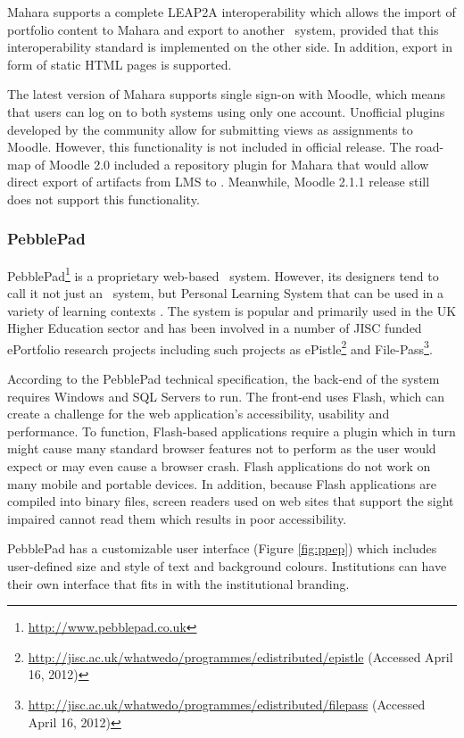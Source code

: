 Mahara supports a complete LEAP2A interoperability
\citep{MaharaGovernanceGroup2011} which allows the import of portfolio content
to Mahara and export to another \ep~system, provided that this interoperability
standard is implemented on the other side. In addition, export in form of static
HTML pages is supported.

The latest version of Mahara supports single sign-on with Moodle, which means
that users can log on to both systems using only one account. Unofficial plugins
developed by the community allow for submitting views as assignments to Moodle.
However, this functionality is not included in official release. The road-map of
Moodle 2.0 included a repository plugin for Mahara that would allow direct
export of artifacts from LMS to \ep. Meanwhile, Moodle 2.1.1 release still does
not support this functionality.

\subsubsection{PebblePad}

PebblePad\footnote{\url{http://www.pebblepad.co.uk}} is a proprietary web-based
\ep~system. However, its designers tend to call it not just an \ep~system, but
Personal Learning System that can be used in a variety of learning contexts
\citep{PebbleLearningLtd2010}. The system is popular and primarily used in the
UK Higher Education sector and has been involved in a number of JISC funded
ePortfolio research projects including such projects as 
ePistle\footnote{\url{http://jisc.ac.uk/whatwedo/programmes/edistributed/epistle}
(Accessed April 16, 2012)} and
File-Pass\footnote{\url{http://jisc.ac.uk/whatwedo/programmes/edistributed/filepass} (Accessed April 16, 2012)}.

According to the PebblePad technical specification, the back-end of the system
requires Windows and SQL Servers to run. The front-end uses Flash, which can
create a challenge for the web application's accessibility, usability and
performance. To function, Flash-based applications require a plugin which in
turn might cause many standard browser features not to perform as the user would
expect or may even cause a browser crash. Flash applications do not work on many
mobile and portable devices. In addition, because Flash applications are
compiled into binary files, screen readers used on web sites that support the
sight impaired cannot read them which results in poor accessibility.

PebblePad has a customizable user interface (Figure \ref{fig:ppep}) which
includes user-defined size and style of text and background colours.
Institutions can have their own interface that fits in with the institutional
branding.

